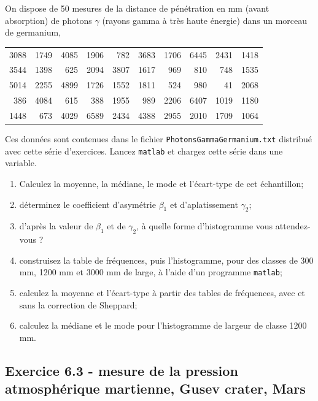On dispose de 50 mesures de la distance de pénétration en mm (avant absorption) de photons $\gamma$ (rayons gamma à très haute énergie) dans un morceau de germanium,
\begin{center}
    \begin{tabular}{|r|r|r|r|r|r|r|r|r|r|}
        3088 & 1749 & 4085 & 1906 & 782  & 3683 & 1706 & 6445 & 2431 & 1418 \\
        3544 & 1398 & 625  & 2094 & 3807 & 1617 & 969  & 810  & 748  & 1535 \\
        5014 & 2255 & 4899 & 1726 & 1552 & 1811 & 524  & 980  & 41   & 2068 \\
        386  & 4084 & 615  & 388  & 1955 & 989  & 2206 & 6407 & 1019 & 1180 \\
        1448 & 673  & 4029 & 6589 & 2434 & 4388 & 2955 & 2010 & 1709 & 1064
    \end{tabular}
\end{center}
Ces données sont contenues dans le fichier \texttt{PhotonsGammaGermanium.txt} distribué avec cette série d'exercices. Lancez \texttt{matlab} et chargez cette série dans une variable.
\begin{enumerate}
    \item Calculez la moyenne, la médiane, le mode et l'écart-type de cet échantillon;
    \item déterminez le coefficient d'asymétrie $\beta_1$ et d'aplatissement $\gamma_2$;
    \item d'après la valeur de $\beta_1$ et de $\gamma_2$, à quelle forme d'histogramme vous attendez-vous ?
    \item construisez la table de fréquences, puis l'histogramme, pour des classes de 300 mm, 1200 mm et 3000 mm de large, à l'aide d'un programme \texttt{matlab};
    \item calculez la moyenne et l'écart-type à partir des tables de fréquences, avec et sans la correction de Sheppard;
    \item calculez la médiane et le mode pour l'histogramme de largeur de classe 1200 mm.
\end{enumerate}

\subsection*{Exercice 6.3 - mesure de la pression atmosphérique martienne, Gusev crater, Mars}

